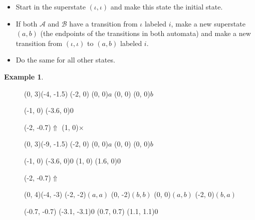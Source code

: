 \documentclass{article}
\theoremstyle{definition}
\newtheorem{example}[theorem]{Example}
\begin{document}
\begin{itemize}
\item Start in the superstate $(\iota, \iota)$ and make this state the 
      initial state.
\item If both $\mathcal{A}$ and $\mathcal{B}$ have a transition from $\iota$ 
      labeled $i$, make a new superstate $(a, b)$ (the endpoints of the 
      transitions in both automata) and make a new transition from 
      $(\iota, \iota)$ to $(a, b)$ labeled $i$.
\item Do the same for all other states.
\end{itemize}

\begin{example}
\begin{figure}[H]
\begin{graph}(0, 3)(-4, -1.5)
  (-2, 0) (0, 0){$a$}
  (0, 0)  (0, 0){$b$}

  (-1, 0) \freetext(-3.6, 0){0}
   
   

  \freetext(-2, -0.7){$\Uparrow$}
  \freetext(1, 0){$\times$}
\end{graph}
\begin{graph}(0, 3)(-9, -1.5)
  (-2, 0) (0, 0){$a$}
  (0, 0)  (0, 0){$b$}

  (-1, 0) \freetext(-3.6, 0){0}
   
   
  (1, 0) \freetext(1.6, 0){0}

  \freetext(-2, -0.7){$\Uparrow$}
\end{graph}

\begin{graph}(0, 4)(-4, -3)
  (-2, -2){$(a, a)$}
  (0, -2){$(b, b)$}
  (0, 0){$(a, b)$}
  (-2, 0){$(b, a)$}

  (-0.7, -0.7) \freetext(-3.1, -3.1){0}
   
   
  (0.7, 0.7) \freetext(1.1, 1.1){0}
   
   


\end{graph}
\end{figure}
\end{example}
\end{document}

